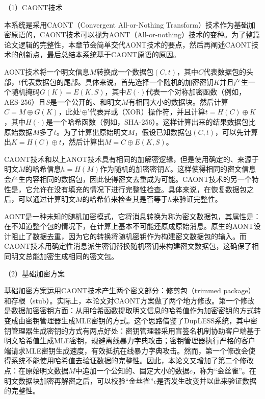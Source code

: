 \documentclass[promaster]{thesis-uestc}
\begin{document}
（1）CAONT技术

本系统是采用CAONT（Convergent All-or-Nothing Transform）技术作为基础加密原语的，CAONT技术可以视为\acrshort{AONT}（All-or-nothing）技术的变种。为了整篇论文逻辑的完整性，本章节会简单交代AONT技术的要点，然后再阐述CAONT技术的创新点，最后总结本系统基于CAONT原语的原因。

AONT技术将一个明文信息$M$转换成一个数据包$(C, t)$，其中$C$代表数据包的头部，$t$代表数据包的尾部。具体来说，首先选择一个随机的加密密钥$K$并且产生一个随机掩码$G(K) = E(K, S)$，其中$E(\cdot)$代表一个对称加密函数（例如，AES-256）且$S$是一个公开的、和明文$M$有相同大小的数据块。然后计算$C = M \oplus G(K)$，此处‘$\oplus$’代表异或（XOR）操作符，并且计算$t = H(C) \oplus K$，其中$H(\cdot)$是一个哈希函数（例如，SHA-256）。这样计算出来的结果数据包比原始数据$M$多了$t$。为了计算出原始明文$M$，假设已知数据包$(C, t)$，可以先计算出$K = H(C) \oplus t$，然后计算出$M = C \oplus E(K, S)$。

CAONT技术和以上ANOT技术具有相同的加解密逻辑，但是使用确定的、来源于明文$M$的哈希信息$h = H(M)$作为随机的加密密钥$K$。这样使得相同的密文信息会产生内容相同的数据包，因此使得密文去重成为可能。CAONT技术的另一个特性是，它允许在没有填充的情况下进行完整性检查。具体来说，在恢复数据包之后，可以通过计算明文$M$的哈希值来检查其是否等于$h$来验证完整性。

AONT是一种未知的随机加密模式，它将消息转换为称为密文数据包，其属性是：在不知道整个包的情况下，在计算上基本不可能还原成原始消息。原生的AONT设计阻止了数据去重，因为它的转换将随机密钥作为构建密文数据包的输入。而CAONT技术用确定性消息派生密钥替换随机密钥来构建密文数据包，这确保了相同明文总能加密生成相同的密文包。

（2）基础加密方案\label{caont-basic}

基础加密方案运用CAONT技术产生两个密文部分：修剪包（trimmed package）和存根（stub）。实际上，本论文对CAONT方案做了两个地方修改。第一个修改是数据加密密钥方面：从用哈希函数提取明文信息的哈希值作为加密密钥的方式转变成由密钥管理器生成MLE密钥的方式。这个思路借鉴了DupLESS系统，其中密钥管理器生成密钥的方式有两点好处：密钥管理器采用盲签名机制协助客户端基于明文哈希值生成MLE密钥，规避离线暴力字典攻击；密钥管理器执行严格的客户端请求MLE密钥生成速度，有效抵抗在线暴力字典攻击。然而，第一个修改会使得系统不能使用哈希值去验证数据的完整性。因此，本论文又增加了第二个修改点：在原始明文数据$M$中追加一个公知的、固定大小的数据$c$，称为“金丝雀”。在明文数据块加密再解密之后，可以校验“金丝雀”$c$是否发生改变并以此来验证数据的完整性。
\end{document}
